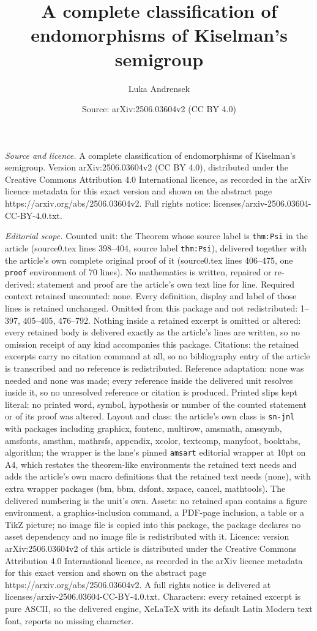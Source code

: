\documentclass[10pt,a4paper]{amsart}
\title[A complete classification of endomorphisms of Kiselman's sem]{A complete classification of endomorphisms of Kiselman's semigroup}
\author{Luka Andrensek}
\date{Source: arXiv:2506.03604v2 (CC BY 4.0)}
\begin{document}
\maketitle

\noindent\emph{Source and licence.} A complete classification of endomorphisms of Kiselman's semigroup. Version arXiv:2506.03604v2 (CC BY 4.0), distributed under the Creative Commons Attribution 4.0 International licence, as recorded in the arXiv licence metadata for this exact version and shown on the abstract page https://arxiv.org/abs/2506.03604v2. Full rights notice: licenses/arxiv-2506.03604-CC-BY-4.0.txt.\par\smallskip

\noindent\textit{Editorial scope.} Counted unit: the Theorem whose source label is \texttt{thm:Psi} in the article (source0.tex lines 398--404, source label \texttt{thm:Psi}), delivered together with the article's own complete original proof of it (source0.tex lines 406--475, one \texttt{proof} environment of 70 lines). No mathematics is written, repaired or re-derived: statement and proof are the article's own text line for line. Required context retained uncounted: none. Every definition, display and label of those lines is retained unchanged. Omitted from this package and not redistributed: 1--397, 405--405, 476--792. Nothing inside a retained excerpt is omitted or altered: every retained body is delivered exactly as the article's lines are written, so no omission receipt of any kind accompanies this package. Citations: the retained excerpts carry no citation command at all, so no bibliography entry of the article is transcribed and no reference is redistributed. Reference adaptation: none was needed and none was made; every reference inside the delivered unit resolves inside it, so no unresolved reference or citation is produced. Printed slips kept literal: no printed word, symbol, hypothesis or number of the counted statement or of its proof was altered. Layout and class: the article's own class is \texttt{sn-jnl} with packages including graphicx, fontenc, multirow, amsmath, amssymb, amsfonts, amsthm, mathrsfs, appendix, xcolor, textcomp, manyfoot, booktabs, algorithm; the wrapper is the lane's pinned \texttt{amsart} editorial wrapper at 10pt on A4, which restates the theorem-like environments the retained text needs and adds the article's own macro definitions that the retained text needs (none), with extra wrapper packages (bm, bbm, dsfont, xspace, cancel, mathtools). The delivered numbering is the unit's own. Assets: no retained span contains a figure environment, a graphics-inclusion command, a PDF-page inclusion, a table or a TikZ picture; no image file is copied into this package, the package declares no asset dependency and no image file is redistributed with it. Licence: version arXiv:2506.03604v2 of this article is distributed under the Creative Commons Attribution 4.0 International licence, as recorded in the arXiv licence metadata for this exact version and shown on the abstract page https://arxiv.org/abs/2506.03604v2. A full rights notice is delivered at licenses/arxiv-2506.03604-CC-BY-4.0.txt. Characters: every retained excerpt is pure ASCII, so the delivered engine, XeLaTeX with its default Latin Modern text font, reports no missing character.
\end{document}
